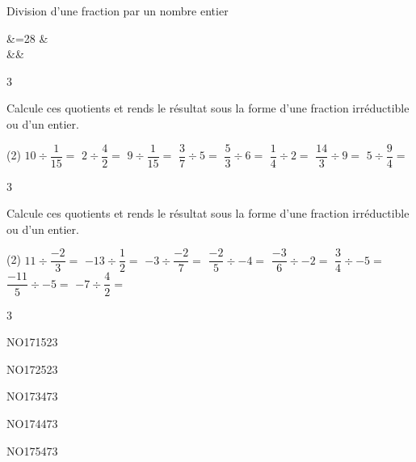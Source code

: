 \documentclass[a4paper,11pt]{report}
\begin{document}
\begin{exop}
\begin{resolu}{Division d'une fraction par un nombre entier}
{\begin{tasks}
\begin{expli}
                &=28
    &\\
				&&
\end{expli}
\end{tasks}
}{3}
\end{resolu}

\begin{exop}{
Calcule ces quotients et rends le résultat sous la forme d'une fraction irréductible ou d'un entier.
\begin{tasks}(2)
	\task $10\div \dfrac{1}{15}=$
    \task $2\div \dfrac{4}{2}=$
	\task $9\div \dfrac{1}{15}=$
	\task $\dfrac{3}{7}\div 5=$
    \task $\dfrac{5}{3}\div 6=$
	\task $\dfrac{1}{4}\div 2=$
	\task $\dfrac{14}{3}\div 9=$
	\task $5\div \dfrac{9}{4}=$
\end{tasks}
}{3}
\end{exop}
\newpage
\begin{exop}{
Calcule ces quotients et rends le résultat sous la forme d'une fraction irréductible ou d'un entier.
\begin{tasks}(2)
	\task $11\div \dfrac{-2}{3}=$
    \task $-13\div \dfrac{1}{2}=$
	\task $-3\div \dfrac{-2}{7}=$
	\task $\dfrac{-2}{5}\div -4=$
    \task $\dfrac{-3}{6}\div -2=$
	\task $\dfrac{3}{4}\div -5=$
	\task $\dfrac{-11}{5}\div -5=$
	\task $-7\div \dfrac{4}{2}=$
\end{tasks}
}{3}
\end{exop}
\end{exop}
\begin{exof}{NO171}{52}{3}
\end{exof}
\begin{exof}{NO172}{52}{3}
\end{exof}


\begin{exol}{NO173}{47}{3}
\end{exol}

\begin{exol}{NO174}{47}{3}
\end{exol}

\begin{exol}{NO175}{47}{3}
\end{exol}
\end{document}
